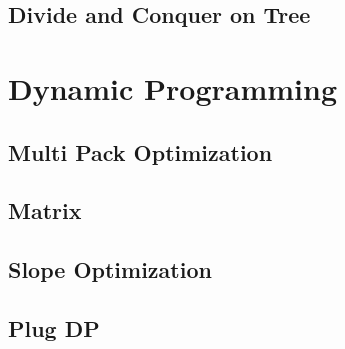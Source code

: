 \documentclass[utf8,8pt]{article}
\begin{document}
\begin{CJK}{UTF8}{gbsn}
	\subsection{Divide and Conquer on Tree}
		
\clearpage
		
\section{Dynamic Programming}
	\subsection{Multi Pack Optimization}
		
	\subsection{Matrix}
		
	\subsection{Slope Optimization}
		
	\subsection{Plug DP}
		
\clearpage	
\end{CJK}
\end{document}
